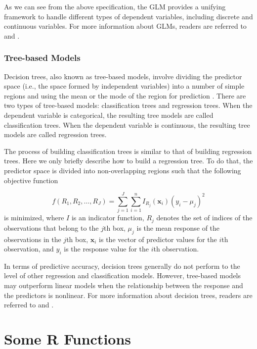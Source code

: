 \documentclass[]{book}
\theoremstyle{definition}
\theoremstyle{definition}
\theoremstyle{definition}
\theoremstyle{remark}
\begin{document}
As we can see from the above specification, the GLM provides a unifying
framework to handle different types of dependent variables, including
discrete and continuous variables. For more information about GLMs,
readers are referred to \citep{dejong2008} and \citep{frees2009}.

\subsubsection{Tree-based Models}\label{tree-based-models}

Decision trees, also known as tree-based models, involve dividing the
predictor space (i.e., the space formed by independent variables) into a
number of simple regions and using the mean or the mode of the region
for prediction \citep{breiman1984}. There are two types of tree-based
models: classification trees and regression trees. When the dependent
variable is categorical, the resulting tree models are called
classification trees. When the dependent variable is continuous, the
resulting tree models are called regression trees.

The process of building classification trees is similar to that of
building regression trees. Here we only briefly describe how to build a
regression tree. To do that, the predictor space is divided into
non-overlapping regions such that the following objective function

\[f(R_1,R_2,\ldots,R_J) = \sum_{j=1}^J \sum_{i=1}^n I_{R_j}(\textbf{x}_i)(y_i - \mu_j)^2\]
is minimized, where \(I\) is an indicator function, \(R_j\) denotes the
set of indices of the observations that belong to the \(j\)th box,
\(\mu_j\) is the mean response of the observations in the \(j\)th box,
\(\textbf{x}_i\) is the vector of predictor values for the \(i\)th
observation, and \(y_i\) is the response value for the \(i\)th
observation.

In terms of predictive accuracy, decision trees generally do not perform
to the level of other regression and classification models. However,
tree-based models may outperform linear models when the relationship
between the response and the predictors is nonlinear. For more
information about decision trees, readers are referred to
\citep{breiman1984} and \citep{mitchell1997}.

\section{Some R Functions}\label{some-r-functions}
\end{document}
